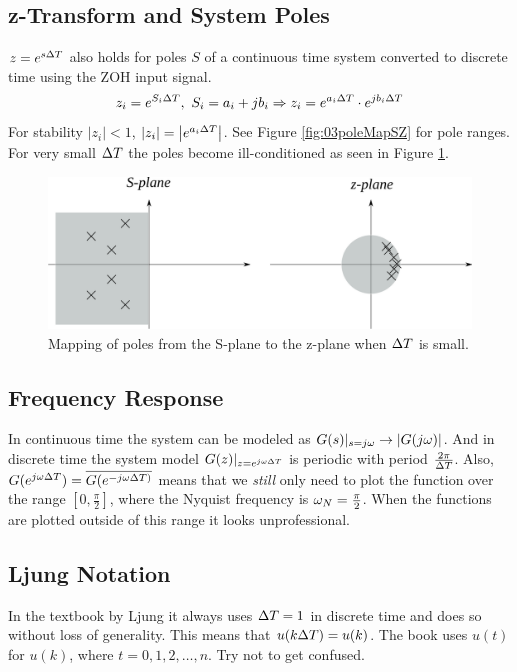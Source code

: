 \documentclass[lecture,12pt,]{pcms-l}
\begin{document}
\subsection{z-Transform and System Poles}
$z=e^{s\Delta T}$ also holds for poles $S$ of a continuous time system converted to discrete time using the ZOH input signal.
$$z_i=e^{S_i\Delta T}, ~ S_i = a_i+jb_i \Rightarrow z_i = e^{a_i\Delta T} \cdot e^{jb_i\Delta T}$$
For stability $|z_i|<1$, $|z_i|=\left| e^{a_i\Delta T}\right|$. See Figure \ref{fig:03poleMapSZ} for pole ranges. For very small $\Delta T$ the poles become ill-conditioned as seen in Figure \ref{fig:03poleMapSZsmallT}.
\begin{figure}[ht!]
	\centering
	\includegraphics[width=.6\textwidth]{images/03poleMapSZsmallT}
	\caption{Mapping of poles from the S-plane to the z-plane when $\Delta T$ is small.}
	\label{fig:03poleMapSZsmallT}
\end{figure}

\subsection{Frequency Response}
In continuous time the system can be modeled as $G(s)|_{s=j\omega}\to|G(j\omega)|$. And in discrete time the system model $G(z)|_{z=e^{j\omega\Delta T}}$ is periodic with period $\frac{2\pi}{\Delta T}$. Also, $G(e^{j\omega\Delta T}) = \overline{G(e^{-j\omega\Delta T)}}$ means that we  \textit{still} only need to plot the function over the range $[0, \frac{\pi}{2}]$, where the Nyquist frequency is $\omega_N=\frac{\pi}{2}$. When the functions are plotted outside of this range it looks unprofessional.

\subsection{Ljung Notation}
In the textbook by Ljung it always uses $\Delta T=1$ in discrete time and does so without loss of generality. This means that $u(k\Delta T) = u(k)$. The book uses $u(t)$ for $u(k)$, where $t=0,1,2,\ldots,n$. Try not to get confused.
\end{document}
